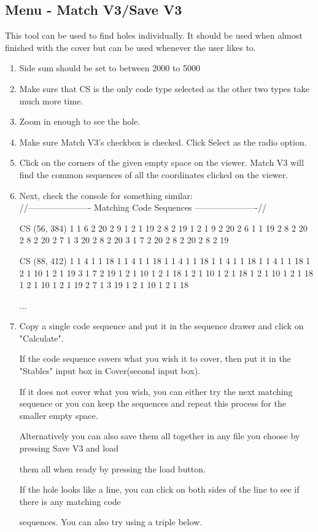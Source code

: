 \documentclass[11pt]{report}
\begin{document}
\subsection{Menu - Match V3/Save V3}
This tool can be used to find holes individually. It should be used when almost finished with the cover but can be used whenever the user likes to.
\begin{enumerate}[Step 1.]
  \item Side sum should be set to between 2000 to 5000
  \item Make sure that CS is the only code type selected as the other two types take much more time. 
  \item Zoom in enough to see the hole.
  \item Make sure Match V3's checkbox is checked. Click Select as the radio option.
  \item Click on the corners of the given empty space on the viewer. Match V3 will find the common sequences
  of all the coordinates clicked on the viewer.
  \item Next, check the console for something similar: \\
  //---------------------- Matching Code Sequences ----------------------//

  CS (56, 384) 1 1 6 2 20 2 9 1 2 1 19 2 8 2 19 1 2 1 9 2 20 2 6 1 1 19 2 8 2 20 2 8 2 20 2 7 1 3 20 2 8 2 20
  3 1 7 2 20 2 8 2 20 2 8 2 19

  CS (88, 412) 1 1 4 1 1 18 1 1 4 1 1 18 1 1 4 1 1 18 1 1 4 1 1 18 1 1 4 1 1 18 1 2 1 10 1 2 1 19 3 1 7 2 19
  1 2 1 10 1 2 1 18 1 2 1 10 1 2 1 18 1 2 1 10 1 2 1 18 1 2 1 10 1 2 1 19 2 7 1 3 19 1 2 1 10 1 2 1 18

  ...
  \item Copy a single code sequence and put it in the sequence drawer and click on "Calculate". 
  
  If the code sequence covers what you wish it to cover, 
  then put it in the "Stables" input box in Cover(second input box). 

  If it does not cover what you wish, you can either try the next matching sequence or you can keep the
  sequences and repeat this process for the smaller empty space.
  
  Alternatively you can also save them all together in any file you choose by pressing Save V3 and load
  
  them all when ready by pressing the load button.
  
  If the hole looks like a line, you can click on both sides of the line to see if there is any matching code
  
  sequences. You can also try using a triple below.
\end{enumerate}
\end{document}
